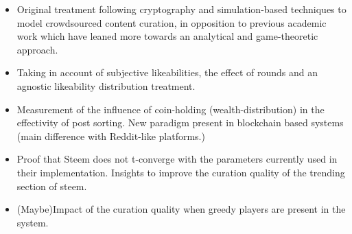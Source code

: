   \begin{itemize}
  
  \item Original treatment following cryptography and simulation-based techniques to model crowdsourced content curation, in opposition to previous academic work which have leaned more towards an analytical and game-theoretic approach.
  
  \item Taking in account of subjective likeabilities, the effect of rounds and an agnostic likeability distribution treatment.
  
  \item Measurement of the influence of coin-holding (wealth-distribution) in the effectivity of post sorting. New paradigm present in blockchain based systems (main difference with Reddit-like platforms.)
   
  \item Proof that Steem does not t-converge with the parameters currently used in their implementation. Insights to improve the curation quality of the trending section of steem.
   
  \item (Maybe)Impact of the curation quality when greedy players are present in the system.
   
  \end{itemize}
    

  
  
  